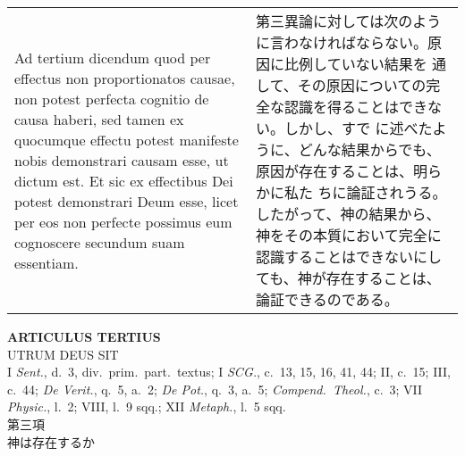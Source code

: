 \documentclass[10pt]{jsarticle}
\begin{document}
\begin{longtable}{p{21em}p{21em}}
\\

{\sc Ad tertium dicendum} quod per effectus non proportionatos causae,
non potest perfecta cognitio de causa haberi, sed tamen ex quocumque
effectu potest manifeste nobis demonstrari causam esse, ut dictum
est. Et sic ex effectibus Dei potest demonstrari Deum esse, licet per
eos non perfecte possimus eum cognoscere secundum suam essentiam.

&

第三異論に対しては次のように言わなければならない。原因に比例していない結果を
通して、その原因についての完全な認識を得ることはできない。しかし、すで
 に述べたように、どんな結果からでも、原因が存在することは、明らかに私た
 ちに論証されうる。したがって、神の結果から、神をその本質において完全に
 認識することはできないにしても、神が存在することは、論証できるのである。

\end{longtable}

\newpage
{}
\begin{center}
 {\Large {\bf ARTICULUS TERTIUS}}\\
 {\large UTRUM DEUS SIT}\\
 {\footnotesize I {\it Sent.}, d.~3, div.~prim.~part.~textus; I {\it
 SCG.}, c.~13, 15, 16, 41, 44; II, c.~15; III, c.~44; {\it De Verit.},
 q.~5, a.~2; {\it De Pot.}, q.~3, a.~5; {\it Compend.~Theol.}, c.~3; VII
 {\it Physic.}, l.~2; VIII, l.~9 sqq.; XII {\it Metaph.}, l.~5 sqq.}\\
 {\Large 第三項\\神は存在するか}
\end{center}
\end{document}
